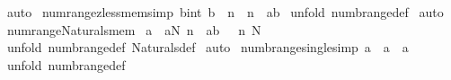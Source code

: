 \begin{isabellebody}
\ auto\isanewline
{}\isamarkupfalse%
%
\endisatagproof
{\isafoldproof}%
%
\isadelimproof
\isanewline
%
\endisadelimproof
\isanewline
{}\isamarkupfalse%
\ num{\isacharunderscore}range{\isacharunderscore}zless{\isacharunderscore}mem{}{\isacharbrackleft}simp{\isacharbrackright}{\isacharcolon}\ {\isachardoublequoteopen}{\isacharbang}{\isacharbang}b{\isacharcolon}{\isacharcolon}int{\isachardot}\ b\ {\isacharless}\ n\ {\isacharequal}{\isacharequal}{\isachargreater}\ {\isacharparenleft}n\ {\isachartilde}{\isacharcolon}\ {\isacharparenleft}a{\isachardot}{\isachardot}b{\isacharparenright}{\isacharparenright}{\isachardoublequoteclose}\isanewline
%
\isadelimproof
%
\endisadelimproof
%
\isatagproof
{}\isamarkupfalse%
\ {\isacharparenleft}unfold\ numb{\isacharunderscore}range{\isacharunderscore}def{\isacharparenright}\isanewline
{}\isamarkupfalse%
\ auto\isanewline
{}\isamarkupfalse%
%
\endisatagproof
{\isafoldproof}%
%
\isadelimproof
\isanewline
%
\endisadelimproof
\isanewline
\isanewline
{}\isamarkupfalse%
\ num{\isacharunderscore}range{\isacharunderscore}Naturals{\isacharunderscore}mem{\isacharcolon}\ \isanewline
{\isachardoublequoteopen}{\isacharbang}{\isacharbang}a{\isachardot}\ {\isacharbrackleft}{\isacharbar}\ a{\isacharcolon}{\isacharpercent}N{\isacharsemicolon}\ n\ {\isacharcolon}\ {\isacharparenleft}a{\isachardot}{\isachardot}b{\isacharparenright}\ {\isacharbar}{\isacharbrackright}\ {\isacharequal}{\isacharequal}{\isachargreater}\ n{\isacharcolon}\ {\isacharpercent}N{\isachardoublequoteclose}\isanewline
%
\isadelimproof
%
\endisadelimproof
%
\isatagproof
{}\isamarkupfalse%
\ {\isacharparenleft}unfold\ numb{\isacharunderscore}range{\isacharunderscore}def\ Naturals{\isacharunderscore}def{\isacharparenright}\isanewline
{}\isamarkupfalse%
\ auto\isanewline
{}\isamarkupfalse%
%
\endisatagproof
{\isafoldproof}%
%
\isadelimproof
\isanewline
%
\endisadelimproof
\isanewline
\isanewline
{}\isamarkupfalse%
\ numb{\isacharunderscore}range{\isacharunderscore}single{\isacharbrackleft}simp{\isacharbrackright}{\isacharcolon}\ {\isachardoublequoteopen}{\isacharparenleft}a\ {\isachardot}{\isachardot}\ a{\isacharparenright}\ {\isacharequal}\ {\isacharbraceleft}a{\isacharbraceright}{\isachardoublequoteclose}\isanewline
%
\isadelimproof
%
\endisadelimproof
%
\isatagproof
{}\isamarkupfalse%
\ {\isacharparenleft}unfold\ numb{\isacharunderscore}range{\isacharunderscore}def{\isacharparenright}\isanewline

\end{isabellebody}
